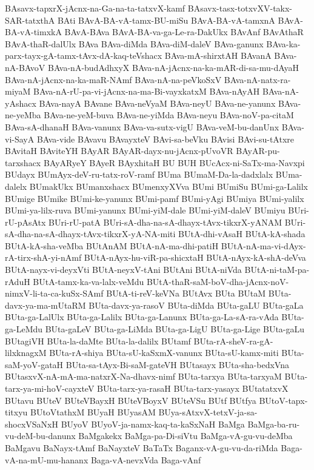 {BAsavx-tapxrX-jAcnx-na-Ga-na-ta-tatxvX-kamf
BAsavx-tasx-totxvXV-takx-SAR-tatxthA
BAti
BAvA-BA-vA-tamx-BU-miSu
BAvA-BA-vA-tamxnA
BAvA-BA-vA-timxkA
BAvA-BAva
BAvA-BA-va-ga-Le-ra-DakUkx
BAvAnf
BAvAthaR
BAvA-thaR-dalUlx
BAva
BAva-diMda
BAva-diM-daleV
BAva-ganunx
BAva-ka-parx-tayx-gA-tamx-tAvx-dA-kaq-teVshacx
BAva-mA-shirxtAH
BAvanA
BAva-nA-BAvoV
BAva-nA-budAdhxyX
BAva-nA-jAcnx-na-ka-mAR-di-sa-mu-dAyaH
BAva-nA-jAcnx-na-ka-maR-NAmf
BAva-nA-na-peVkoSxV
BAva-nA-natx-ra-miyaM
BAva-nA-rU-pa-vi-jAcnx-na-ma-Bi-vayxkatxM
BAva-nAyAH
BAva-nA-yAshacx
BAva-nayA
BAvane
BAva-neVyaM
BAva-neyU
BAva-ne-yanunx
BAva-ne-yeMba
BAva-ne-yeM-buva
BAva-ne-yiMda
BAva-neyu
BAva-noV-pa-citaM
BAva-sA-dhanaH
BAva-vanunx
BAva-va-sutx-vigU
BAva-veM-bu-danUnx
BAva-vi-SayA
BAva-vide
BAvavu
BAvayxteV
BAvi-sa-beVku
BAvisi
BAvi-su-tAtxre
BAvitaH
BAviteYH
BAyAR
BAyAR-dayx-nu-jAcnx-pUvoVR
BAyAR-pu-tarxshacx
BAyARyeY
BAyeR
BAyxhitaH
BU
BUH
BUcAcx-ni-SaTx-ma-Navxpi
BUdayx
BUmAyx-deV-ru-tatx-roV-ramf
BUma
BUmaM-Da-la-dadxlalx
BUma-dalelx
BUmakUkx
BUmanxshacx
BUmenxyXVva
BUmi
BUmiSu
BUmi-ga-Lalilx
BUmige
BUmike
BUmi-ke-yanunx
BUmi-pamf
BUmi-yAgi
BUmiya
BUmi-yalilx
BUmi-ya-lilx-ruva
BUmi-yanunx
BUmi-yiM-dale
BUmi-yiM-daleV
BUmiyu
BUri-rU-pAsAtx
BUri-rU-patA
BUri-sA-dha-na-sA-dhayx-tAvx-tikxrX-yANAM
BUri-sA-dha-na-sA-dhayx-tAvx-tikxrX-yA-NA-miti
BUtA-dhi-vAsaH
BUtA-kA-shada
BUtA-kA-sha-veMba
BUtAnAM
BUtA-nA-ma-dhi-patiH
BUtA-nA-ma-vi-dAyx-rA-tirx-shA-yi-nAmf
BUtA-nAyx-hu-viR-pa-shicxtaH
BUtA-nAyx-kA-shA-deVva
BUtA-nayx-vi-deyxVti
BUtA-neyxV-tAni
BUtAni
BUtA-niVda
BUtA-ni-taM-pa-rAduH
BUtA-tamx-ka-va-lalx-veMdu
BUtA-thaR-saM-boV-dha-jAcnx-noV-nimxV-li-ta-ca-kuSx-SAmf
BUtA-ti-reV-keVNa
BUtAvx
BUta
BUtaM
BUta-davx-ya-ma-mUtaRM
BUta-davx-ya-rasoV
BUta-diMda
BUta-gaLU
BUta-gaLa
BUta-ga-LalUlx
BUta-ga-Lalilx
BUta-ga-Lanunx
BUta-ga-La-sA-ra-vAda
BUta-ga-LeMdu
BUta-gaLeV
BUta-ga-LiMda
BUta-ga-LigU
BUta-ga-Lige
BUta-gaLu
BUtagiVH
BUta-la-daMte
BUta-la-dalilx
BUtamf
BUta-rA-sheV-ra-gA-lilxknagxM
BUta-rA-shiya
BUta-sU-kaSxmX-vanunx
BUta-sU-kamx-miti
BUta-saM-yoV-gataH
BUta-sa-tAyx-Bi-saM-gateVH
BUtasayx
BUta-sha-bedxVna
BUtasxvX-nA-mA-ma-natxrX-Na-dhavx-nimf
BUta-tarxya
BUta-tarxyaM
BUta-tarx-ya-mi-hoV-cayxteV
BUta-tarx-ya-rasaH
BUta-tarx-yasayx
BUtatatxvX
BUtavu
BUteV
BUteVBayxH
BUteVBoyxV
BUteVSu
BUtf
BUtfya
BUtoV-tapx-titxyu
BUtoVtathxM
BUyaH
BUyasAM
BUya-sAtxvX-tetxV-ja-sa-shocxVSaNxH
BUyoV
BUyoV-ja-namx-kaq-ta-kaSxNaH
BaMga
BaMga-ba-ru-vu-deM-bu-danunx
BaMgakekx
BaMga-pa-Di-siVtu
BaMga-vA-gu-vu-deMba
BaMgavu
BaNayx-tAmf
BaNayxteV
BaTaTx
Baganx-vA-gu-vu-da-riMda
Baga-vA-na-mU-mu-hananx
Baga-vA-nevxVda
Baga-vAnf
}
